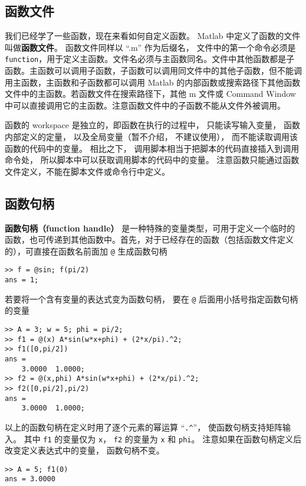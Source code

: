 

\subsection{函数文件}

我们已经学了一些函数，现在来看如何自定义函数。 Matlab 中定义了函数的文件叫做\textbf{函数文件}。 函数文件同样以 “.m” 作为后缀名， 文件中的第一个命令必须是 \verb|function|，用于定义主函数。文件名必须与主函数同名。文件中其他函数都是子函数。主函数可以调用子函数，子函数可以调用同文件中的其他子函数，但不能调用主函数，主函数和子函数都可以调用 Matlab 的内部函数或搜索路径下其他函数文件中的主函数。若函数文件在搜索路径下，其他 m 文件或 Command Window 中可以直接调用它的主函数。注意函数文件中的子函数不能从文件外被调用。

函数的 workspace 是独立的，即函数在执行的过程中， 只能读写输入变量， 函数内部定义的定量， 以及全局变量（暂不介绍， 不建议使用）， 而不能读取调用该函数的代码中的变量。 相比之下， 调用脚本相当于把脚本的代码直接插入到调用命令处， 所以脚本中可以获取调用脚本的代码中的变量。 注意函数只能通过函数文件定义，不能在脚本文件或命令行中定义。

\subsection{函数句柄}
\textbf{函数句柄（function handle）} 是一种特殊的变量类型，可用于定义一个临时的函数，也可传递到其他函数中。首先，对于已经存在的函数（包括函数文件定义的），可直接在函数名前面加 \verb|@| 生成函数句柄
\begin{lstlisting}[language=matlabC]
>> f = @sin; f(pi/2)
ans = 1;
\end{lstlisting}
若要将一个含有变量的表达式变为函数句柄， 要在 \verb|@| 后面用小括号指定函数句柄的变量
\begin{lstlisting}[language=matlabC]
>> A = 3; w = 5; phi = pi/2;
>> f1 = @(x) A*sin(w*x+phi) + (2*x/pi).^2;
>> f1([0,pi/2])
ans =
    3.0000  1.0000;
>> f2 = @(x,phi) A*sin(w*x+phi) + (2*x/pi).^2;
>> f2([0,pi/2],pi/2)
ans =
    3.0000  1.0000;
\end{lstlisting}
以上的函数句柄在定义时用了逐个元素的幂运算 “\verb|.^|”， 使函数句柄支持矩阵输入。 其中 \verb|f1| 的变量仅为 \verb|x|， \verb|f2| 的变量为 \verb|x| 和 \verb|phi|。 注意如果在函数句柄定义后改变定义表达式中的变量， 函数句柄不变。
\begin{lstlisting}[language=matlabC]
>> A = 5; f1(0)
ans = 3.0000
\end{lstlisting}

